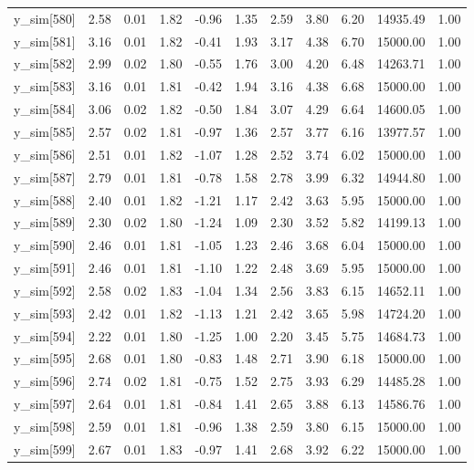 \begin{table}[ht]
\begin{tabular}{rrrrrrrrrrr}
  y\_sim[580] & 2.58 & 0.01 & 1.82 & -0.96 & 1.35 & 2.59 & 3.80 & 6.20 & 14935.49 & 1.00 \\ 
  y\_sim[581] & 3.16 & 0.01 & 1.82 & -0.41 & 1.93 & 3.17 & 4.38 & 6.70 & 15000.00 & 1.00 \\ 
  y\_sim[582] & 2.99 & 0.02 & 1.80 & -0.55 & 1.76 & 3.00 & 4.20 & 6.48 & 14263.71 & 1.00 \\ 
  y\_sim[583] & 3.16 & 0.01 & 1.81 & -0.42 & 1.94 & 3.16 & 4.38 & 6.68 & 15000.00 & 1.00 \\ 
  y\_sim[584] & 3.06 & 0.02 & 1.82 & -0.50 & 1.84 & 3.07 & 4.29 & 6.64 & 14600.05 & 1.00 \\ 
  y\_sim[585] & 2.57 & 0.02 & 1.81 & -0.97 & 1.36 & 2.57 & 3.77 & 6.16 & 13977.57 & 1.00 \\ 
  y\_sim[586] & 2.51 & 0.01 & 1.82 & -1.07 & 1.28 & 2.52 & 3.74 & 6.02 & 15000.00 & 1.00 \\ 
  y\_sim[587] & 2.79 & 0.01 & 1.81 & -0.78 & 1.58 & 2.78 & 3.99 & 6.32 & 14944.80 & 1.00 \\ 
  y\_sim[588] & 2.40 & 0.01 & 1.82 & -1.21 & 1.17 & 2.42 & 3.63 & 5.95 & 15000.00 & 1.00 \\ 
  y\_sim[589] & 2.30 & 0.02 & 1.80 & -1.24 & 1.09 & 2.30 & 3.52 & 5.82 & 14199.13 & 1.00 \\ 
  y\_sim[590] & 2.46 & 0.01 & 1.81 & -1.05 & 1.23 & 2.46 & 3.68 & 6.04 & 15000.00 & 1.00 \\ 
  y\_sim[591] & 2.46 & 0.01 & 1.81 & -1.10 & 1.22 & 2.48 & 3.69 & 5.95 & 15000.00 & 1.00 \\ 
  y\_sim[592] & 2.58 & 0.02 & 1.83 & -1.04 & 1.34 & 2.56 & 3.83 & 6.15 & 14652.11 & 1.00 \\ 
  y\_sim[593] & 2.42 & 0.01 & 1.82 & -1.13 & 1.21 & 2.42 & 3.65 & 5.98 & 14724.20 & 1.00 \\ 
  y\_sim[594] & 2.22 & 0.01 & 1.80 & -1.25 & 1.00 & 2.20 & 3.45 & 5.75 & 14684.73 & 1.00 \\ 
  y\_sim[595] & 2.68 & 0.01 & 1.80 & -0.83 & 1.48 & 2.71 & 3.90 & 6.18 & 15000.00 & 1.00 \\ 
  y\_sim[596] & 2.74 & 0.02 & 1.81 & -0.75 & 1.52 & 2.75 & 3.93 & 6.29 & 14485.28 & 1.00 \\ 
  y\_sim[597] & 2.64 & 0.01 & 1.81 & -0.84 & 1.41 & 2.65 & 3.88 & 6.13 & 14586.76 & 1.00 \\ 
  y\_sim[598] & 2.59 & 0.01 & 1.81 & -0.96 & 1.38 & 2.59 & 3.80 & 6.15 & 15000.00 & 1.00 \\ 
  y\_sim[599] & 2.67 & 0.01 & 1.83 & -0.97 & 1.41 & 2.68 & 3.92 & 6.22 & 15000.00 & 1.00 \\ 

\end{tabular}
\end{table}
